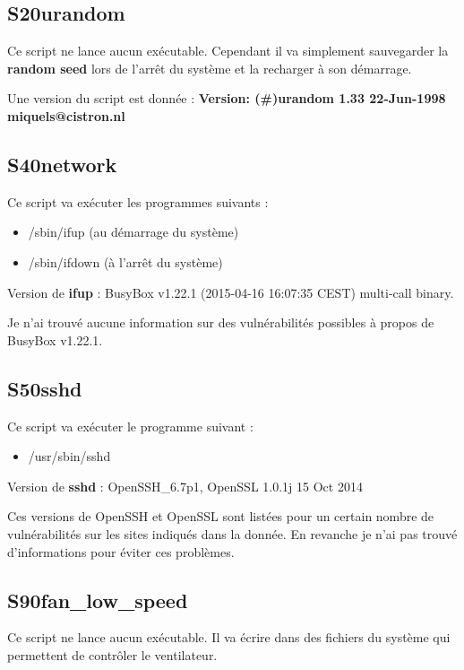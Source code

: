 \subsection{S20urandom}

Ce script ne lance aucun exécutable. Cependant il va simplement sauvegarder la \textbf{random seed} lors de l'arrêt du système et la recharger à son démarrage.

Une version du script est donnée : \textbf{Version:	(\#)urandom  1.33  22-Jun-1998  miquels@cistron.nl}

\subsection{S40network}

Ce script va exécuter les programmes suivants :

\begin{itemize}
	\item /sbin/ifup (au démarrage du système)
	\item /sbin/ifdown (à l'arrêt du système)
\end{itemize}

Version de \textbf{ifup} : BusyBox v1.22.1 (2015-04-16 16:07:35 CEST) multi-call binary.

Je n'ai trouvé aucune information sur des vulnérabilités possibles à propos de BusyBox v1.22.1.

\subsection{S50sshd}

Ce script va exécuter le programme suivant :

\begin{itemize}
	\item /usr/sbin/sshd
\end{itemize}

Version de \textbf{sshd} : OpenSSH\_6.7p1, OpenSSL 1.0.1j 15 Oct 2014

Ces versions de OpenSSH et OpenSSL sont listées pour un certain nombre de vulnérabilités sur les sites indiqués dans la donnée. En revanche je n'ai pas trouvé d'informations pour éviter ces problèmes.

\subsection{S90fan\_low\_speed}

Ce script ne lance aucun exécutable. Il va écrire dans des fichiers du système qui permettent de contrôler le ventilateur.

